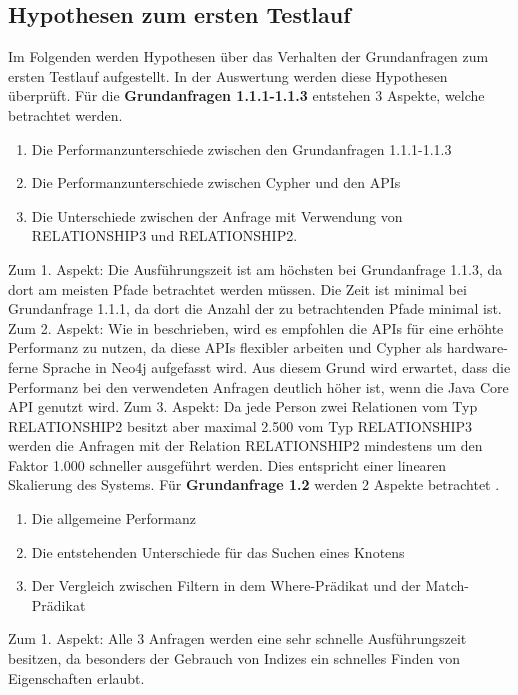 \subsection{Hypothesen zum ersten Testlauf}
Im Folgenden werden Hypothesen über das Verhalten der Grundanfragen zum ersten Testlauf aufgestellt. In der Auswertung werden diese Hypothesen überprüft. \newline \newline
Für die \textbf{Grundanfragen 1.1.1-1.1.3} entstehen 3 Aspekte, welche betrachtet werden.
\begin{enumerate}
\item Die Performanzunterschiede zwischen den Grundanfragen 1.1.1-1.1.3
\item Die Performanzunterschiede zwischen Cypher und den APIs
\item Die Unterschiede zwischen der Anfrage mit Verwendung von RELATIONSHIP3 und RELATIONSHIP2.
\end{enumerate}
Zum 1. Aspekt: Die Ausführungszeit ist am höchsten bei Grundanfrage 1.1.3, da dort am meisten Pfade betrachtet werden müssen. Die Zeit ist minimal bei Grundanfrage 1.1.1, da dort die Anzahl der zu betrachtenden Pfade minimal ist. \newline
 Zum 2. Aspekt: Wie in \parencite{raj2015neo4j} beschrieben, wird es empfohlen die APIs für eine erhöhte Performanz zu nutzen, da diese APIs flexibler arbeiten und Cypher als hardware-ferne Sprache in Neo4j aufgefasst wird. Aus diesem Grund wird erwartet, dass die Performanz bei den verwendeten Anfragen deutlich höher ist, wenn die Java Core API genutzt wird. \newline
Zum 3. Aspekt: Da jede Person zwei Relationen vom Typ RELATIONSHIP2 besitzt aber maximal 2.500 vom Typ RELATIONSHIP3 werden die Anfragen mit der Relation RELATIONSHIP2 mindestens um den Faktor 1.000 schneller ausgeführt werden. Dies entspricht einer linearen Skalierung des Systems. \newline \newline
Für \textbf{Grundanfrage 1.2} werden 2 Aspekte betrachtet .
\begin{enumerate}
	\item Die allgemeine Performanz 
	\item Die entstehenden Unterschiede für das Suchen eines Knotens
	\item Der Vergleich zwischen Filtern in dem Where-Prädikat und der Match-Prädikat
\end{enumerate}
Zum 1. Aspekt: Alle 3 Anfragen werden eine sehr schnelle Ausführungszeit besitzen, da besonders der Gebrauch von Indizes ein schnelles Finden von Eigenschaften erlaubt. \newline
